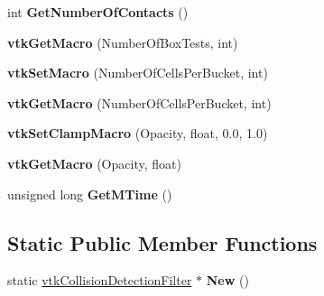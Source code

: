 \begin{DoxyCompactItemize}
\item 
\hypertarget{classvtkCollisionDetectionFilter_a909c0634a5922f3cc89128759d10f583}{
int {\bfseries GetNumberOfContacts} ()}
\label{classvtkCollisionDetectionFilter_a909c0634a5922f3cc89128759d10f583}

\item 
\hypertarget{classvtkCollisionDetectionFilter_a9508339604c8842739e3a958f09f60f7}{
{\bfseries vtkGetMacro} (NumberOfBoxTests, int)}
\label{classvtkCollisionDetectionFilter_a9508339604c8842739e3a958f09f60f7}

\item 
\hypertarget{classvtkCollisionDetectionFilter_a2fed3ab49fe8fff33d29ca474394501e}{
{\bfseries vtkSetMacro} (NumberOfCellsPerBucket, int)}
\label{classvtkCollisionDetectionFilter_a2fed3ab49fe8fff33d29ca474394501e}

\item 
\hypertarget{classvtkCollisionDetectionFilter_a435ab5049a3356a5ad190e244d701b00}{
{\bfseries vtkGetMacro} (NumberOfCellsPerBucket, int)}
\label{classvtkCollisionDetectionFilter_a435ab5049a3356a5ad190e244d701b00}

\item 
\hypertarget{classvtkCollisionDetectionFilter_ab6b6c78957162d62067fb90bac184491}{
{\bfseries vtkSetClampMacro} (Opacity, float, 0.0, 1.0)}
\label{classvtkCollisionDetectionFilter_ab6b6c78957162d62067fb90bac184491}

\item 
\hypertarget{classvtkCollisionDetectionFilter_a2c2a8b177113a5b02b14a250f6bff4dd}{
{\bfseries vtkGetMacro} (Opacity, float)}
\label{classvtkCollisionDetectionFilter_a2c2a8b177113a5b02b14a250f6bff4dd}

\item 
\hypertarget{classvtkCollisionDetectionFilter_a002a7e0830197e208f5c8773622a3d24}{
unsigned long {\bfseries GetMTime} ()}
\label{classvtkCollisionDetectionFilter_a002a7e0830197e208f5c8773622a3d24}

\end{DoxyCompactItemize}
\subsection*{Static Public Member Functions}
\begin{DoxyCompactItemize}
\item 
\hypertarget{classvtkCollisionDetectionFilter_a3ba83f0f8879106d66ef68c4831ff513}{
static \hyperlink{classvtkCollisionDetectionFilter}{vtkCollisionDetectionFilter} $\ast$ {\bfseries New} ()}
\label{classvtkCollisionDetectionFilter_a3ba83f0f8879106d66ef68c4831ff513}

\end{DoxyCompactItemize}
